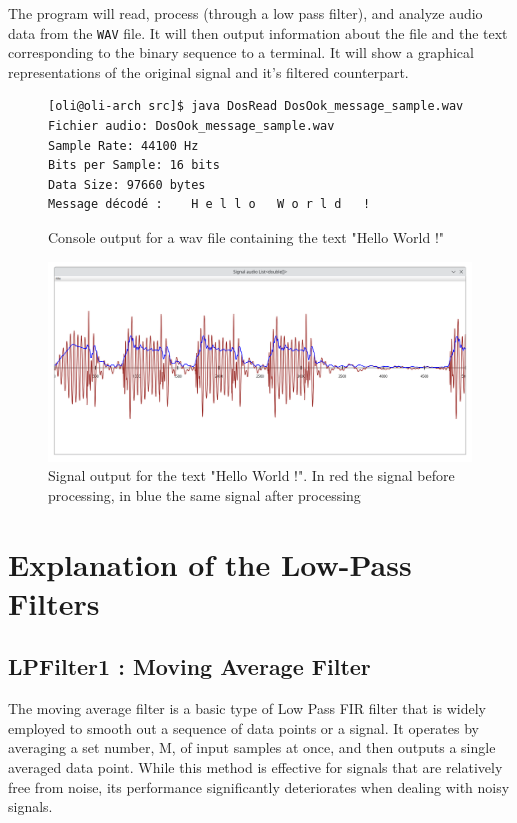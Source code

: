 The program will read, process (through a low pass filter), and analyze audio data from the \texttt{WAV} file. It will then output information about the file and the text corresponding to the binary sequence to a terminal. It will show a graphical representations of the original signal and it's filtered counterpart.

\begin{figure}[!h]
	\begin{lstlisting}[style=console]
[oli@oli-arch src]$ java DosRead DosOok_message_sample.wav
Fichier audio: DosOok_message_sample.wav
Sample Rate: 44100 Hz
Bits per Sample: 16 bits
Data Size: 97660 bytes
Message décodé :    H e l l o   W o r l d   !
	\end{lstlisting}
	\caption{Console output for a wav file containing the text "Hello World !"}
\end{figure}

\begin{figure}[!h]
	\begin{center}
		\includegraphics[width=15cm]{images/StdDraw2.png}
	\end{center}
	\caption{Signal output for the text "Hello World !". In red the signal before processing, in blue the same signal after processing}
\end{figure}

\newpage

\section{Explanation of the Low-Pass Filters}

\subsection{LPFilter1 : Moving Average Filter}

The moving average filter is a basic type of Low Pass FIR filter that is widely employed to smooth out a sequence of data points or a signal. It operates by averaging a set number, M, of input samples at once, and then outputs a single averaged data point. While this method is effective for signals that are relatively free from noise, its performance significantly deteriorates when dealing with noisy signals.

